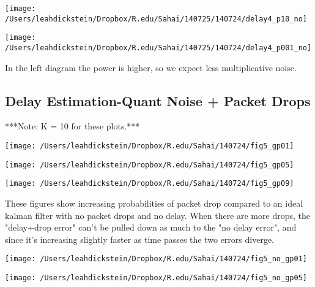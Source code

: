 \documentclass[leqno,twocolumn]{article}
\begin{document}
\begin{minipage}[c]{0.5\textwidth}
\texttt{[image: /Users/leahdickstein/Dropbox/R.edu/Sahai/140725/140724/delay4\_p10\_no]}
\end{minipage}
\begin{minipage}[c]{0.5\textwidth}
\texttt{[image: /Users/leahdickstein/Dropbox/R.edu/Sahai/140725/140724/delay4\_p001\_no]}
\end{minipage}

In the left diagram the power is higher, so we expect less multiplicative noise.

\subsection{Delay Estimation-Quant Noise + Packet Drops}
***Note: K = 10 for these plots.***

\begin{minipage}[c]{0.5\textwidth}
\texttt{[image: /Users/leahdickstein/Dropbox/R.edu/Sahai/140724/fig5\_gp01]}
\end{minipage}
\begin{minipage}[c]{0.5\textwidth}
\texttt{[image: /Users/leahdickstein/Dropbox/R.edu/Sahai/140724/fig5\_gp05]}
\end{minipage}

\begin{minipage}[c]{0.5\textwidth}
\texttt{[image: /Users/leahdickstein/Dropbox/R.edu/Sahai/140724/fig5\_gp09]}
\end{minipage}
\begin{minipage}[b]{0.5\textwidth}
These figures show increasing probabilities of packet drop compared to an ideal kalman filter with no packet drops and no delay. When there are more drops, the "delay+drop error" can't be pulled down as much to the "no delay error", and since it's increasing slightly faster as time passes the two errors diverge.
\end{minipage}

\begin{minipage}[c]{0.5\textwidth}
\texttt{[image: /Users/leahdickstein/Dropbox/R.edu/Sahai/140724/fig5\_no\_gp01]}
\end{minipage}
\begin{minipage}[c]{0.5\textwidth}
\texttt{[image: /Users/leahdickstein/Dropbox/R.edu/Sahai/140724/fig5\_no\_gp05]}
\end{minipage}
\end{document}
